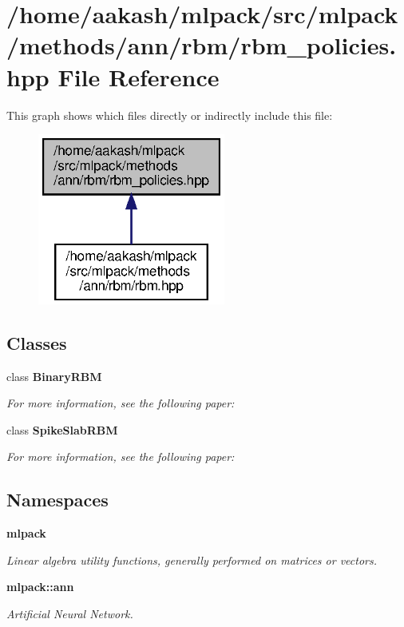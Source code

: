 \section{/home/aakash/mlpack/src/mlpack/methods/ann/rbm/rbm\+\_\+policies.hpp File Reference}
\label{rbm__policies_8hpp}
This graph shows which files directly or indirectly include this file\+:
\nopagebreak
\begin{figure}[H]
\begin{center}
\leavevmode
\includegraphics[width=175pt]{rbm__policies_8hpp__dep__incl}
\end{center}
\end{figure}
\subsection*{Classes}
\begin{DoxyCompactItemize}
\item 
class \textbf{ Binary\+R\+BM}
\begin{DoxyCompactList}\small\item\em For more information, see the following paper\+: \end{DoxyCompactList}\item 
class \textbf{ Spike\+Slab\+R\+BM}
\begin{DoxyCompactList}\small\item\em For more information, see the following paper\+: \end{DoxyCompactList}\end{DoxyCompactItemize}
\subsection*{Namespaces}
\begin{DoxyCompactItemize}
\item 
 \textbf{ mlpack}
\begin{DoxyCompactList}\small\item\em Linear algebra utility functions, generally performed on matrices or vectors. \end{DoxyCompactList}\item 
 \textbf{ mlpack\+::ann}
\begin{DoxyCompactList}\small\item\em Artificial Neural Network. \end{DoxyCompactList}\end{DoxyCompactItemize}


